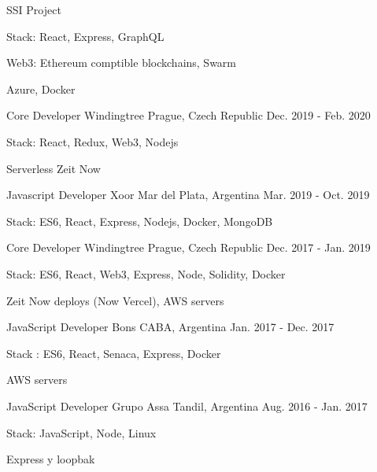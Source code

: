 \begin{cventries}
{ %
\begin{cvitems}
\item {SSI Project}
\item {Stack: React, Express, GraphQL}
\item {Web3: Ethereum comptible blockchains, Swarm}
\item {Azure, Docker}
\end{cvitems}
}
\cventry
{Core Developer} %
{Windingtree} %
{Prague, Czech Republic} %
{Dec. 2019 - Feb. 2020} %
{ %
\begin{cvitems}
\item {Stack: React, Redux, Web3, Nodejs}
\item {Serverless Zeit Now}
\end{cvitems}
}
\cventry
{Javascript Developer} %
{Xoor} %
{Mar del Plata, Argentina} %
{Mar. 2019 - Oct. 2019} %
{ %
\begin{cvitems}
\item {Stack: ES6, React, Express, Nodejs, Docker, MongoDB}
\end{cvitems}
}
\cventry
{Core Developer} %
{Windingtree} %
{Prague, Czech Republic} %
{Dec. 2017 - Jan. 2019} %
{ %
\begin{cvitems}
\item {Stack: ES6, React, Web3, Express, Node, Solidity, Docker}
\item {Zeit Now deploys (Now Vercel), AWS servers}
\end{cvitems}
}
\cventry
{JavaScript Developer} %
{Bons} %
{CABA, Argentina} %
{Jan. 2017 - Dec. 2017} %
{ %
\begin{cvitems}
\item {Stack : ES6, React, Senaca, Express, Docker}
\item {AWS servers}
\end{cvitems}
}
\cventry
{JavaScript Developer} %
{Grupo Assa} %
{Tandil, Argentina} %
{Aug. 2016 - Jan. 2017} %
{ %
\begin{cvitems}
\item {Stack: JavaScript, Node, Linux}
\item {Express y loopbak}
\end{cvitems}
}


\end{cventries}
